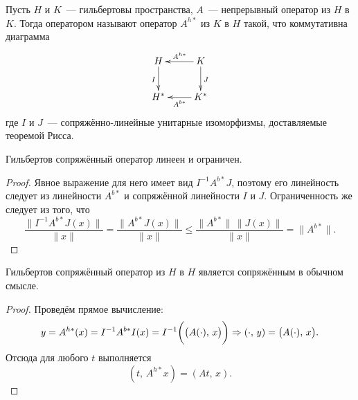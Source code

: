 \documentclass{notes}
\begin{document}
	\begin{de}
		Пусть $H$ и $K$~--- гильбертовы пространства, $A$~--- непрерывный оператор из $H$ в $K$. Тогда  оператором называют оператор $A^{h*}$ из $K$ в $H$ такой, что коммутативна диаграмма
		\[
       		\xymatrix{H \ar@{->}[d]_I \ar@{<-}[r]^{A^{h*}} & K \ar@{->}[d]^J \\
       					H^* \ar@{<-}[r]_{A^{b*}} & K^*}	
		\]
		где $I$ и $J$~--- сопряжённо-линейные унитарные изоморфизмы, доставляемые теоремой Рисса.
	\end{de}

	\begin{st}	
		Гильбертов сопряжённый оператор линеен и ограничен.
		\begin{proof}
			Явное выражение для него имеет вид $I^{-1} A^{b*} J$, поэтому его линейность следует из линейности $A^{b*}$ и сопряжённой линейности $I$ и $J$. Ограниченность же следует из того, что 
			\[
				\dfrac{\|I^{-1}A^{b*}J(x)\|}{\|x\|} = \dfrac{\|A^{b*}J(x)\|}{\|x\|} \leqslant \dfrac{\|A^{b*}\|\, \|J(x)\|}{\|x\|} = \|A^{b*}\|.
			\]
		\end{proof}
	\end{st}

	\begin{st}
		Гильбертов сопряжённый оператор из $H$ в $H$ является сопряжённым в обычном смысле.
		\begin{proof}
			Проведём прямое вычисление:
			\[
				y = A^{h*}(x) = I^{-1} A^{b*} I(x) = I^{-1}\bigg(\big(A(\cdot), \, x\big)\bigg) \Rightarrow (\cdot, \, y) = \big(A(\cdot), \, x\big).
			\]
			Отсюда для любого $t$ выполняется
			\[
				(t, \, A^{h*}x) = (At, \, x).
			\]
		\end{proof}
	\end{st}
\end{document}
